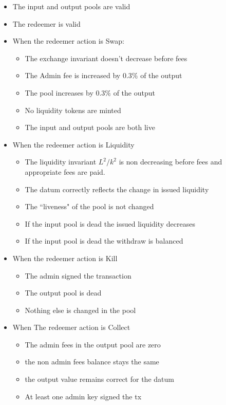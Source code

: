\documentclass{article}
\begin{document}
\begin{itemize}
	\item The input and output pools are valid
	\item The redeemer is valid
	\item When the redeemer action is Swap:
		\begin{itemize}
			\item The exchange invariant doesn't decrease before fees
			\item The Admin fee is increased by $0.3\%$ of the output
			\item The pool increases by $0.3\%$ of the output
			\item No liquidity tokens are minted
			\item The input and output pools are both live
		\end{itemize}
	\item When the redeemer action is Liquidity
		\begin{itemize}
			\item The liquidity invariant $L^2/k^2$ is non decreasing before fees
			and appropriate fees are paid.
			\item The datum correctly reflects the change in issued liquidity
			\item The ``liveness" of the pool is not changed
			\item If the input pool is dead the issued liquidity decreases
			\item If the input pool is dead the withdraw is balanced
		\end{itemize}
	\item When the redeemer action is Kill
		\begin{itemize}
			\item The admin signed the transaction
			\item The output pool is dead
			\item Nothing else is changed in the pool
		\end{itemize}
	\item When The redeemer action is Collect
		\begin{itemize}
			\item The admin fees in the output pool are zero
			\item the non admin fees balance stays the same
			\item the output value remains correct for the datum
			\item At least one admin key signed the tx
		\end{itemize}
\end{itemize}
\end{document}
